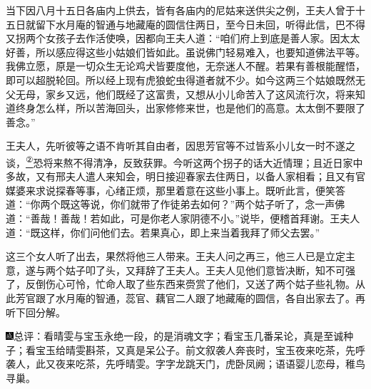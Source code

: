 当下因八月十五日各庙内上供去，皆有各庙内的尼姑来送供尖之例，王夫人曾于十五日就留下水月庵的智通与地藏庵的圆信住两日，至今日未回，听得此信，巴不得又拐两个女孩子去作活使唤，因都向王夫人道：``咱们府上到底是善人家。因太太好善，所以感应得这些小姑娘们皆如此。虽说佛门轻易难入，也要知道佛法平等。我佛立愿，原是一切众生无论鸡犬皆要度他，无奈迷人不醒。若果有善根能醒悟，即可以超脱轮回。所以经上现有虎狼蛇虫得道者就不少。如今这两三个姑娘既然无父无母，家乡又远，他们既经了这富贵，又想从小儿命苦入了这风流行次，将来知道终身怎么样，所以苦海回头，出家修修来世，也是他们的高意。太太倒不要限了善念。''

王夫人，先听彼等之语不肯听其自由者，因思芳官等不过皆系小儿女一时不遂之谈，\href{../Text/part0081_split_000.html\#lnkback_2_a}{\textsuperscript{②}}恐将来熬不得清净，反致获罪。今听这两个拐子的话大近情理；且近日家中多故，又有邢夫人遣人来知会，明日接迎春家去住两日，以备人家相看；且又有官媒婆来求说探春等事，心绪正烦，那里着意在这些小事上。既听此言，便笑答道：``你两个既这等说，你们就带了作徒弟去如何？''两个姑子听了，念一声佛道：``善哉！善哉！若如此，可是你老人家阴德不小。''说毕，便稽首拜谢。王夫人道：``既这样，你们问他们去。若果真心，即上来当着我拜了师父去罢。''

这三个女人听了出去，果然将他三人带来。王夫人问之再三，他三人已是立定主意，遂与两个姑子叩了头，又拜辞了王夫人。王夫人见他们意皆决断，知不可强了，反倒伤心可怜，忙命人取了些东西来赍赏了他们，又送了两个姑子些礼物。从此芳官跟了水月庵的智通，蕊官、藕官二人跟了地藏庵的圆信，各自出家去了。再听下回分解。

{\includegraphics[width=3mm]{../Images/00005}\kaishu 总评：看晴雯与宝玉永绝一段，的是消魂文字；看宝玉几番呆论，真是至诚种子；看宝玉给晴雯斟茶，又真是呆公子。前文叙袭人奔丧时，宝玉夜来吃茶，先呼袭人，此又夜来吃茶，先呼晴雯。字字龙跳天门，虎卧凤阙；语语婴儿恋母，稚鸟寻巢。}


